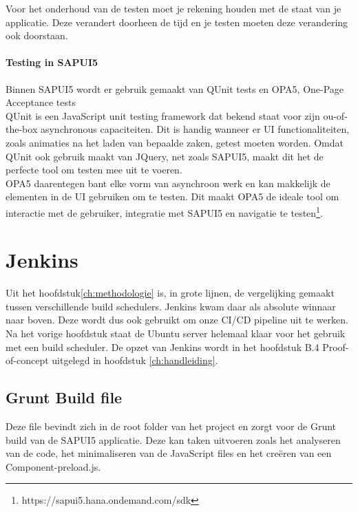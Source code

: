 Voor het onderhoud van de testen moet je rekening houden met de staat van je applicatie. Deze verandert doorheen de tijd en je testen moeten deze verandering ook doorstaan.

    \paragraph{Testing in SAPUI5}
    Binnen SAPUI5 wordt er gebruik gemaakt van QUnit tests en OPA5, One-Page Acceptance tests\\
    QUnit is een JavaScript unit testing framework dat bekend staat voor zijn ou-of-the-box asynchronous capaciteiten. Dit is handig wanneer er UI functionaliteiten, zoals animaties na het laden van bepaalde zaken, getest moeten worden. Omdat QUnit ook gebruik maakt van JQuery, net zoals SAPUI5, maakt dit het de perfecte tool om testen mee uit te voeren.\\
    OPA5 daarentegen bant elke vorm van asynchroon werk en kan makkelijk de elementen in de UI gebruiken om te testen. Dit maakt OPA5 de ideale tool om interactie met de gebruiker, integratie met SAPUI5 en navigatie te testen\footnote{https://sapui5.hana.ondemand.com/sdk}.
    
\section{Jenkins}
\label{sec:short-list}
Uit het hoofdstuk\ref{ch:methodologie} is, in grote lijnen, de vergelijking gemaakt tussen verschillende build schedulers. Jenkins kwam daar als absolute winnaar naar boven. Deze wordt dus ook gebruikt om onze CI/CD pipeline uit te werken.
Na het vorige hoofdstuk staat de Ubuntu server helemaal klaar voor het gebruik met een build scheduler. De opzet van Jenkins wordt in het hoofdstuk B.4 Proof-of-concept uitgelegd in hoofdstuk \ref{ch:handleiding}.
    
    \subsection{Grunt Build file}
    Deze file bevindt zich in de root folder van het project en zorgt voor de Grunt build van de SAPUI5 applicatie. Deze kan taken uitvoeren zoals het analyseren van de code, het minimaliseren van de JavaScript files en het creëren van een Component-preload.js.
    
